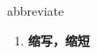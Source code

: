 
\begin{frame}
{\huge abbreviate}
\begin{center}
\begin{enumerate}\Large
  \item \textbf{缩写，缩短}
\end{enumerate}
\end{center}
\end{frame}

